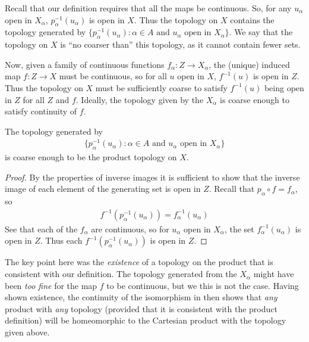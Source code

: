       Recall that our definition requires that all the maps be continuous.
      So, for any $u_\alpha$ open in $X_\alpha$, $p_\alpha^{-1}(u_\alpha)$ is open in $X$.
      Thus the topology on $X$ contains the topology generated by $\{p_\alpha^{-1}(u_\alpha):\alpha\in A\text{ and } u_\alpha\text{ open in }X_\alpha\}$.
      We say that the topology on $X$ is ``no coarser than'' this topology, as it cannot contain fewer sets.
      
      Now, given a family of continuous functions $f_\alpha:Z\rightarrow X_\alpha$, the (unique) induced map $f:Z\rightarrow X$ must be continuous, so for all $u$ open in $X$, $f^{-1}(u)$ is open in $Z$.
      Thus the topology on $X$ must be sufficiently coarse to satisfy $f^{-1}(u)$ being open in $Z$ for all $Z$ and $f$.
      Ideally, the topology given by the $X_\alpha$ is coarse enough to satisfy continuity of $f$.

      \begin{thm}
        The topology generated by 
        \begin{align*}
          \{p_\alpha^{-1}(u_\alpha):\alpha\in A\text{ and } u_\alpha\text{ open in }X_\alpha\}
        \end{align*}
        is coarse enough to be the product topology on $X$.
      \end{thm}
      \begin{proof}
        By the properties of inverse images it is sufficient to show that the inverse image of each element of the generating set is open in $Z$.
        Recall that $p_\alpha\circ f=f_\alpha$, so 
        \begin{align*}
          f^{-1}(p_\alpha^{-1}(u_\alpha)) = f_\alpha^{-1}(u_\alpha)
        \end{align*}
        See that each of the $f_\alpha$ are continuous, so for $u_\alpha$ open in $X_\alpha$, the set $f_\alpha^{-1}(u_\alpha)$ is open in $Z$.
        Thus each $f^{-1}(p_\alpha^{-1}(u_\alpha))$ is open in $Z$.
      \end{proof}

      \begin{rmk}
        The key point here was the \emph{existence} of a topology on the product that is consistent with our definition. 
        The topology generated from the $X_\alpha$ might have been \emph{too fine} for the map $f$ to be continuous, but we this is not the case.
        Having shown existence, the continuity of the isomorphism in  then shows that \emph{any} product with \emph{any}  topology (provided that it is consistent with the product definition) will be homeomorphic to the Cartesian product with the topology given above.
      \end{rmk}


